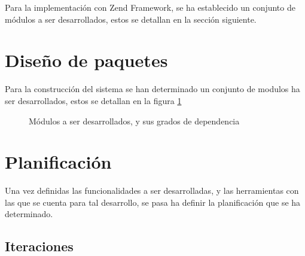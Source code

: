 Para la implementación con Zend Framework, se ha establecido un conjunto de
módulos a ser desarrollados, estos se detallan en la sección siguiente.

\section{Diseño de paquetes}

Para la construcción del sistema se han determinado un conjunto de modulos ha
ser desarrollados, estos se detallan en la figura \ref{paquetes}

\begin{figure}
\centering

\caption{Módulos a ser desarrollados, y sus grados de dependencia}
\label{paquetes}
\end{figure}

\section{Planificación}

Una vez definidas las funcionalidades a ser desarrolladas, y las herramientas
con las que se cuenta para tal desarrollo, se pasa ha definir la planificación
que se ha determinado.

\subsection{Iteraciones}

